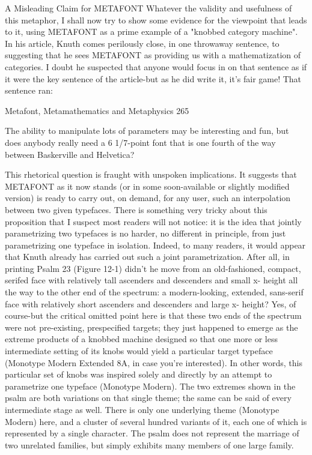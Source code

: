                       A Misleading Claim for METAFONT
   Whatever the validity and usefulness of this metaphor, I shall now try to show some
evidence for the viewpoint that leads to it, using METAFONT as a prime example of a
"knobbed category machine". In his article, Knuth comes perilously close, in one
throwaway sentence, to suggesting that he sees METAFONT as providing us with a
mathematization of categories. I doubt he suspected that anyone would focus in on that
sentence as if it were the key sentence of the article-but as he did write it, it's fair game!
That sentence ran:




Metafont, Metamathematics and Metaphysics                                                 265

The ability to manipulate lots of parameters may be interesting and fun, but does anybody
really need a 6 1/7-point font that is one fourth of the way between Baskerville and
Helvetica?

   This rhetorical question is fraught with unspoken implications. It suggests that
METAFONT as it now stands (or in some soon-available or slightly modified version) is
ready to carry out, on demand, for any user, such an interpolation between two given
typefaces. There is something very tricky about this proposition that I suspect most
readers will not notice: it is the idea that jointly parametrizing two typefaces is no harder,
no different in principle, from just parametrizing one typeface in isolation.
   Indeed, to many readers, it would appear that Knuth already has carried out such a
joint parametrization. After all, in printing Psalm 23 (Figure 12-1) didn't he move from
an old-fashioned, compact, serifed face with relatively tall ascenders and descenders and
small x- height all the way to the other end of the spectrum: a modern-looking, extended,
sans-serif face with relatively short ascenders and descenders and large x- height? Yes, of
course-but the critical omitted point here is that these two ends of the spectrum were not
pre-existing, prespecified targets; they just happened to emerge as the extreme products
of a knobbed machine designed so that one more or less intermediate setting of its knobs
would yield a particular target typeface (Monotype Modern Extended 8A, in case you're
interested).
   In other words, this particular set of knobs was inspired solely and directly by an
attempt to parametrize one typeface (Monotype Modern). The two extremes shown in the
psalm are both variations on that single theme; the same can be said of every intermediate
stage as well. There is only one underlying theme (Monotype Modern) here, and a cluster
of several hundred variants of it, each one of which is represented by a single character.
The psalm does not represent the marriage of two unrelated families, but simply exhibits
many members of one large family.




